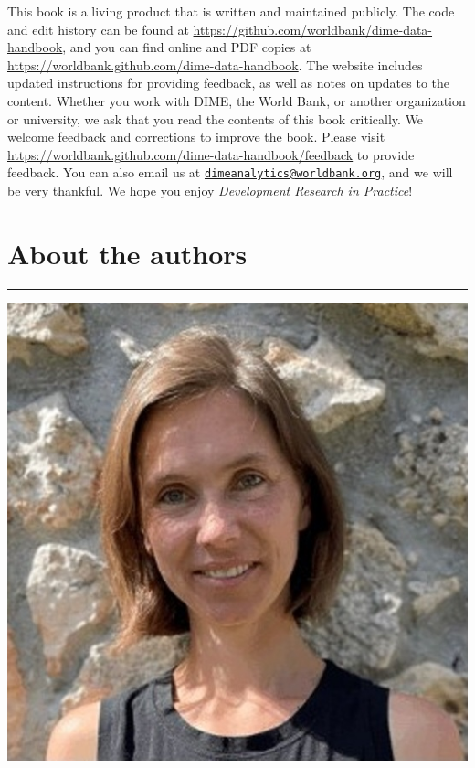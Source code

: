 \documentclass[
]{book}
\begin{document}
This book is a living product that is written and maintained publicly. The code and edit history can be found at \url{https://github.com/worldbank/dime-data-handbook}, and you can find online and PDF copies at \url{https://worldbank.github.com/dime-data-handbook}. The website includes updated instructions for providing feedback, as well as notes on updates to the content. Whether you work with DIME, the World Bank, or another organization or university, we ask that you read the contents of this book critically. We welcome feedback and corrections to improve the book. Please visit \url{https://worldbank.github.com/dime-data-handbook/feedback} to provide feedback. You can also email us at \href{mailto:dimeanalytics@worldbank.org}{\nolinkurl{dimeanalytics@worldbank.org}}, and we will be very thankful. We hope you enjoy \emph{Development Research in Practice}!

\hypertarget{about-the-authors}{%
\chapter*{About the authors}\label{about-the-authors}}

\begin{center}\rule{0.5\linewidth}{0.5pt}\end{center}

\includegraphics{author-bios/maria-pic.jpg}
\end{document}
